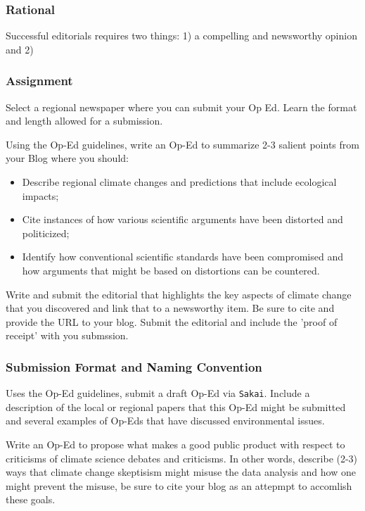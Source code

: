 
\subsubsection{Rational}

Successful editorials requires two things: 1) a compelling and newsworthy opinion and 2) 

\subsubsection{Assignment}

Select a regional newspaper where you can submit your Op Ed. Learn the format and length allowed for a submission. 


Using the Op-Ed guidelines, write an Op-Ed to summarize 2-3 salient points from your Blog where you should:

\begin{itemize}
  \item Describe regional climate changes and predictions that include ecological impacts; 
  \item Cite instances of how various scientific arguments have been distorted and politicized;
  \item Identify how conventional scientific standards have been compromised and how arguments that might be based on distortions can be countered.
\end{itemize}

Write and submit the editorial that highlights the key aspects of climate change that you discovered and link that to a newsworthy item. Be sure to cite and provide the URL to your blog. Submit the editorial and include the 'proof of receipt' with you submssion. 


\subsubsection{Submission Format and Naming Convention}

Uses the Op-Ed guidelines, submit a draft Op-Ed via \texttt{Sakai}. Include a description of the local or regional papers that this Op-Ed might be submitted and several examples of Op-Eds that have discussed environmental issues.

Write an Op-Ed to propose what makes a good public product with respect to criticisms of climate science debates and criticisms. In other words, describe (2-3) ways that climate change skeptisism might misuse the data analysis and how one might prevent the misuse, be sure to cite your blog as an attepmpt to accomlish these goals. 

